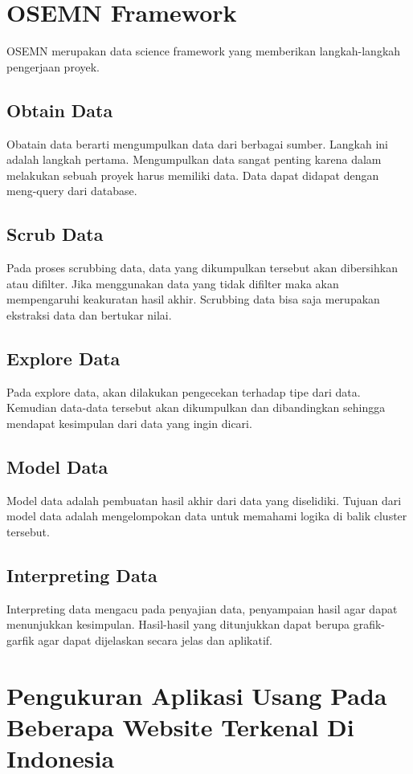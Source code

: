 \section{OSEMN Framework}
OSEMN merupakan data science framework yang memberikan langkah-langkah pengerjaan proyek.
\subsection{Obtain Data}
Obatain data berarti mengumpulkan data dari berbagai sumber. Langkah ini adalah langkah pertama. Mengumpulkan data sangat penting karena dalam melakukan sebuah proyek harus memiliki data. Data dapat didapat dengan meng-query dari database.

\subsection{Scrub Data}
Pada proses scrubbing data, data yang dikumpulkan tersebut akan dibersihkan atau difilter. Jika menggunakan data yang tidak difilter maka akan mempengaruhi keakuratan hasil akhir. Scrubbing data bisa saja merupakan ekstraksi data dan bertukar nilai.

\subsection{Explore Data}
Pada explore data, akan dilakukan pengecekan terhadap tipe dari data. Kemudian data-data tersebut akan dikumpulkan dan dibandingkan sehingga mendapat kesimpulan dari data yang ingin dicari. 

\subsection{Model Data}
Model data adalah pembuatan hasil akhir dari data yang diselidiki. Tujuan dari model data adalah mengelompokan data untuk memahami logika di balik cluster tersebut. 

\subsection{Interpreting Data}
Interpreting data mengacu pada penyajian data, penyampaian hasil agar dapat menunjukkan kesimpulan. Hasil-hasil yang ditunjukkan dapat berupa grafik-garfik agar dapat dijelaskan secara jelas dan aplikatif.




\section{Pengukuran Aplikasi Usang Pada Beberapa Website Terkenal Di Indonesia}
